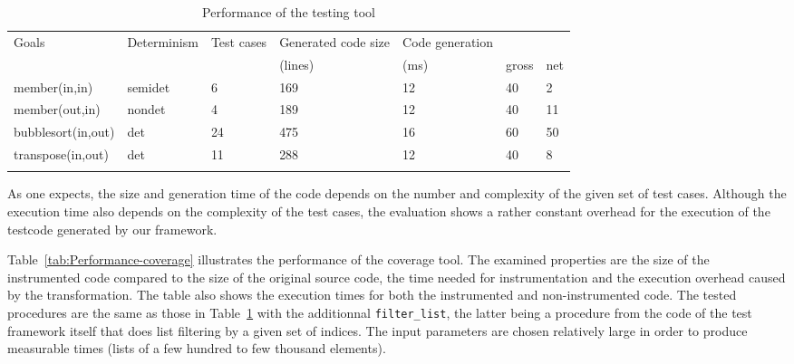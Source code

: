 \documentclass[british]{llncs}
\providecommand{\tabularnewline}{\\}
\begin{document}
\begin{table}[h]
\centering{}\begin{tabular}{|l||>{\centering}p{0.8in}|>{\centering}p{0.4in}|>{\centering}p{0.7in}|>{\centering}p{0.7in}|>{\centering}p{0.4in}|>{\centering}p{0.4in}|}
\hline 
{\scriptsize Goals} & {\scriptsize Determinism} & {\scriptsize Test cases} & {\scriptsize Generated code size } & {\scriptsize Code generation} & \multicolumn{2}{c|}{{\scriptsize Execution (ns)}}\tabularnewline
\cline{6-7} 
 &  &  & {\scriptsize (lines)} & {\scriptsize (ms)} & {\scriptsize gross} & {\scriptsize net}\tabularnewline
\hline
\hline 
{\scriptsize member(in,in)} & {\scriptsize semidet} & {\scriptsize 6} & {\scriptsize 169} & {\scriptsize 12} & {\scriptsize 40} & {\scriptsize 2}\tabularnewline
\hline 
{\scriptsize member(out,in)} & {\scriptsize nondet} & {\scriptsize 4} & {\scriptsize 189} & {\scriptsize 12} & {\scriptsize 40} & {\scriptsize 11}\tabularnewline
\hline 
{\scriptsize bubblesort(in,out)} & {\scriptsize det} & {\scriptsize 24} & {\scriptsize 475} & {\scriptsize 16} & {\scriptsize 60} & {\scriptsize 50}\tabularnewline
\hline 
{\scriptsize transpose(in,out)} & {\scriptsize det} & {\scriptsize 11} & {\scriptsize 288} & {\scriptsize 12} & {\scriptsize 40} & {\scriptsize 8}\tabularnewline
\hline 
\multicolumn{1}{l}{} & \multicolumn{1}{>{\centering}p{0.8in}}{} & \multicolumn{1}{>{\centering}p{0.4in}}{} & \multicolumn{1}{>{\centering}p{0.7in}}{} & \multicolumn{1}{>{\centering}p{0.7in}}{} & \multicolumn{1}{>{\centering}p{0.4in}}{} & \multicolumn{1}{>{\centering}p{0.4in}}{}\tabularnewline
\end{tabular}\caption{\label{tab:Performance-testing}Performance of the testing tool}
\end{table}

As one expects, the size and generation time of the code depends on the number and complexity
of the given set of test cases. Although the execution time also depends on the complexity of the test cases, the evaluation shows a rather constant overhead for the execution of the testcode generated by our framework.



Table~\ref{tab:Performance-coverage} illustrates the performance of the coverage tool. The examined properties
are the size of the instrumented code compared to the size of the original source code, the time needed for instrumentation and the execution overhead caused by the transformation. The table also shows the execution times for both the instrumented and non-instrumented code. The tested procedures are the same as those in Table~\ref{tab:Performance-testing} with the additionnal \texttt{filter\_list}, the latter being a procedure from the code of the test framework itself that does list filtering by a given set of indices. The input parameters are
chosen relatively large in order to produce measurable times (lists of a few hundred to few thousand elements).
\end{document}
